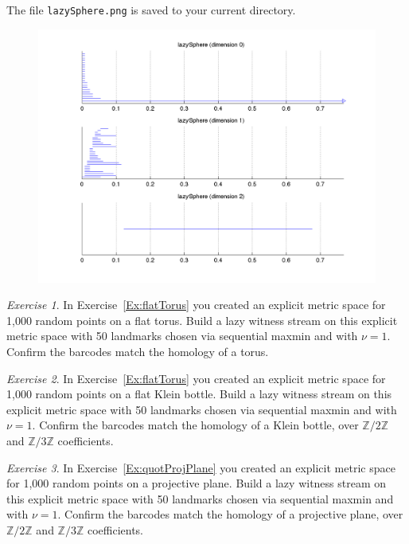 \documentclass[amscd, amssymb, verbatim]{amsart}[12pt]
\theoremstyle{remark}
\newtheorem{exercise}{Exercise}
\theoremstyle{remark}
\theoremstyle{remark}
\newcommand{\Z}{\mathbb{Z}}
\begin{document}
The file \texttt{lazySphere.png} is saved to your current directory.

\begin{figure}[htp]
	\begin{center}
    	\includegraphics[width=6in]{lazySphere.png}
   	\end{center}
\end{figure}
\FloatBarrier

\begin{exercise}\label{Ex:flatTorusLazy}
In Exercise~\ref{Ex:flatTorus} you created an explicit metric space for 1,000 random points on a flat torus. Build a lazy witness stream on this explicit metric space with 50 landmarks chosen via sequential maxmin and with $\nu = 1$.  Confirm the barcodes match the homology of a torus. 
\end{exercise}

\begin{exercise}\label{Ex:flatKleinLazy}
In Exercise~\ref{Ex:flatTorus} you created an explicit metric space for 1,000 random points on a flat Klein bottle. Build a lazy witness stream on this explicit metric space with 50 landmarks chosen via sequential maxmin and with $\nu = 1$.  Confirm the barcodes match the homology of a Klein bottle, over $\Z/2\Z$ and $\Z/3\Z$ coefficients. 
\end{exercise}

\begin{exercise}\label{Ex:quotProjPlaneLazy}
In Exercise~\ref{Ex:quotProjPlane} you created an explicit metric space for 1,000 random points on a projective plane. Build a lazy witness stream on this explicit metric space with 50 landmarks chosen via sequential maxmin and with $\nu = 1$.  Confirm the barcodes match the homology of a projective plane, over $\Z/2\Z$ and $\Z/3\Z$ coefficients. 
\end{exercise}
\end{document}
